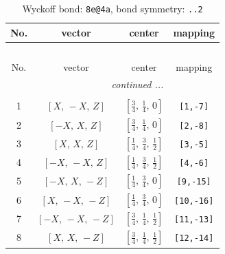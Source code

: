 \documentclass[fleqn,8pt]{jsarticle}
\begin{document}
\begin{longtable}{cccc}
\caption{Wyckoff bond: {\tt 8e@4a}, bond symmetry: {\tt ..2}}
 \\
 \hline \hline
No. & vector & center & mapping \\ \hline \endfirsthead

\multicolumn{3}{l}{\tablename\ \thetable{}} \\
 \hline \hline
No. & vector & center & mapping \\ \hline \endhead

 \hline \hline
\multicolumn{3}{r}{\footnotesize\it continued ...} \\ \endfoot

 \hline \hline
\multicolumn{3}{r}{} \\ \endlastfoot

1 & $\left[ X,\, - X,\, Z \right]$ & $\left[ \frac{3}{4},\, \frac{1}{4},\, 0 \right]$ & {\tt [1,-7]} \\ \hline
2 & $\left[ - X,\, X,\, Z \right]$ & $\left[ \frac{3}{4},\, \frac{1}{4},\, 0 \right]$ & {\tt [2,-8]} \\ \hline
3 & $\left[ X,\, X,\, Z \right]$ & $\left[ \frac{1}{4},\, \frac{3}{4},\, \frac{1}{2} \right]$ & {\tt [3,-5]} \\ \hline
4 & $\left[ - X,\, - X,\, Z \right]$ & $\left[ \frac{1}{4},\, \frac{3}{4},\, \frac{1}{2} \right]$ & {\tt [4,-6]} \\ \hline
5 & $\left[ - X,\, X,\, - Z \right]$ & $\left[ \frac{1}{4},\, \frac{3}{4},\, 0 \right]$ & {\tt [9,-15]} \\ \hline
6 & $\left[ X,\, - X,\, - Z \right]$ & $\left[ \frac{1}{4},\, \frac{3}{4},\, 0 \right]$ & {\tt [10,-16]} \\ \hline
7 & $\left[ - X,\, - X,\, - Z \right]$ & $\left[ \frac{3}{4},\, \frac{1}{4},\, \frac{1}{2} \right]$ & {\tt [11,-13]} \\ \hline
8 & $\left[ X,\, X,\, - Z \right]$ & $\left[ \frac{3}{4},\, \frac{1}{4},\, \frac{1}{2} \right]$ & {\tt [12,-14]} \\
\end{longtable}
\renewcommand{\arraystretch}{1.2}
\end{document}
